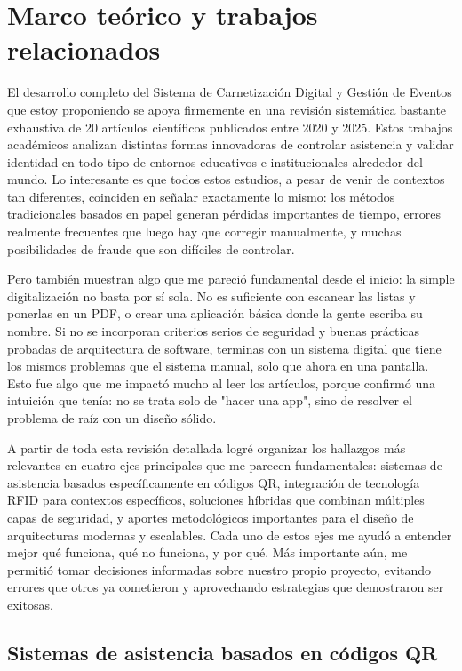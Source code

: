 \section{Marco teórico y trabajos relacionados}

El desarrollo completo del Sistema de Carnetización Digital y Gestión de Eventos que estoy proponiendo se apoya firmemente en una revisión sistemática bastante exhaustiva de 20 artículos científicos publicados entre 2020 y 2025. Estos trabajos académicos analizan distintas formas innovadoras de controlar asistencia y validar identidad en todo tipo de entornos educativos e institucionales alrededor del mundo. Lo interesante es que todos estos estudios, a pesar de venir de contextos tan diferentes, coinciden en señalar exactamente lo mismo: los métodos tradicionales basados en papel generan pérdidas importantes de tiempo, errores realmente frecuentes que luego hay que corregir manualmente, y muchas posibilidades de fraude que son difíciles de controlar.

Pero también muestran algo que me pareció fundamental desde el inicio: la simple digitalización no basta por sí sola. No es suficiente con escanear las listas y ponerlas en un PDF, o crear una aplicación básica donde la gente escriba su nombre. Si no se incorporan criterios serios de seguridad y buenas prácticas probadas de arquitectura de software, terminas con un sistema digital que tiene los mismos problemas que el sistema manual, solo que ahora en una pantalla. Esto fue algo que me impactó mucho al leer los artículos, porque confirmó una intuición que tenía: no se trata solo de "hacer una app", sino de resolver el problema de raíz con un diseño sólido.

A partir de toda esta revisión detallada logré organizar los hallazgos más relevantes en cuatro ejes principales que me parecen fundamentales: sistemas de asistencia basados específicamente en códigos QR, integración de tecnología RFID para contextos específicos, soluciones híbridas que combinan múltiples capas de seguridad, y aportes metodológicos importantes para el diseño de arquitecturas modernas y escalables. Cada uno de estos ejes me ayudó a entender mejor qué funciona, qué no funciona, y por qué. Más importante aún, me permitió tomar decisiones informadas sobre nuestro propio proyecto, evitando errores que otros ya cometieron y aprovechando estrategias que demostraron ser exitosas.

\subsection{Sistemas de asistencia basados en códigos QR}

